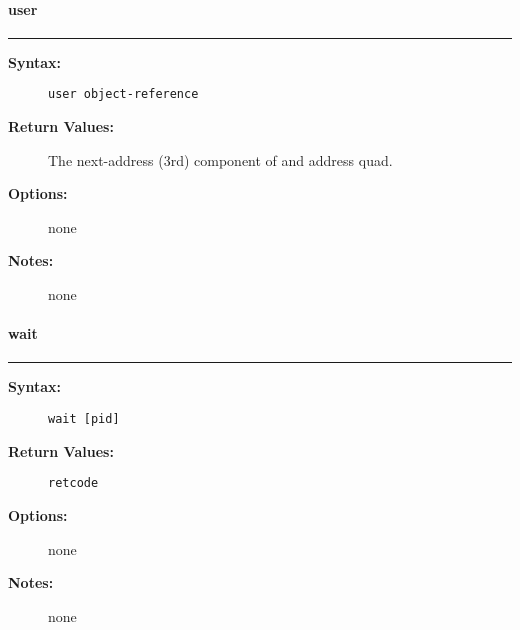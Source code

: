 \vspace {2pt}


\paragraph{user}

\hrule
\begin{description}
\item[{\bf Syntax:}] \mbox{}

{\tt user object-reference}

\item[{\bf Return Values:}] \mbox{}

The next-address (3rd) component of 
and address quad.

\item[{\bf Options:}] \mbox{}

none  

\item[{\bf Notes:}] \mbox{}

none

\end{description}


\vspace {2pt}


\paragraph{wait}

\hrule
\begin{description}
\item[{\bf Syntax:}] \mbox{}

{\tt wait [pid]}

\item[{\bf Return Values:}] \mbox{}

{\tt retcode}

\item[{\bf Options:}] \mbox{}

none  

\item[{\bf Notes:}] \mbox{}

none

\end{description}

